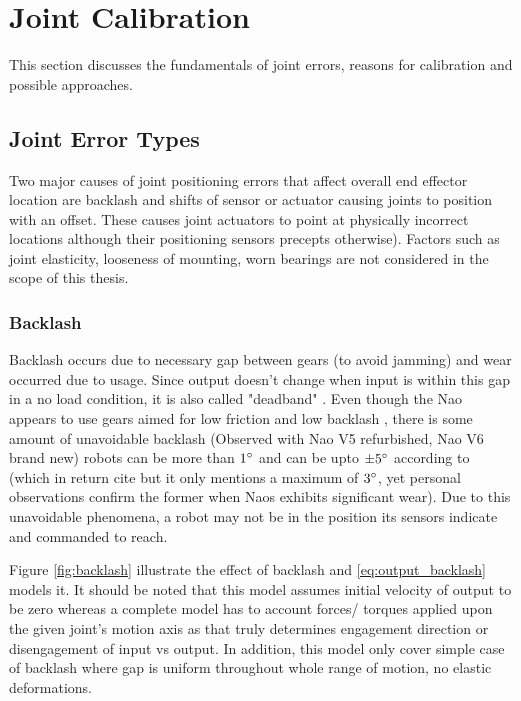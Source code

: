 \documentclass[english, printversion, nomenclature, notitle]{tuvisionthesis} %
\begin{document}
\section{Joint Calibration}
This section discusses the fundamentals of joint errors, reasons for calibration and possible approaches.

\subsection{Joint Error Types}

Two major causes of joint positioning errors that affect overall end effector location are backlash and shifts of sensor or actuator causing joints to position with an offset. These causes joint actuators to point at physically incorrect locations although their positioning sensors precepts otherwise). Factors such as joint elasticity, looseness of mounting, worn bearings are not considered in the scope of this thesis.

\subsubsection{Backlash}
\label{subsec:backlash}
Backlash occurs due to necessary gap between gears (to avoid jamming) and wear occurred due to usage. Since output doesn't change when input is within this gap in a no load condition, it is also called "deadband" \cite{ferney1995development}. Even though the Nao appears to use gears aimed for low friction and low backlash \cite{gouaillier_nao_2008}, there is some amount of unavoidable backlash (Observed with Nao V5 refurbished, Nao V6 brand new) robots can be more than $1\degree$ and can be upto $\pm 5\degree$ according to \cite{kastner_automatic_2015} (which in return cite \cite{gouaillier_nao_2008} but it only mentions a maximum of $3\degree$, yet personal observations confirm the former when Naos exhibits significant wear). Due to this unavoidable phenomena, a robot may not be in the position its sensors indicate and commanded to reach.

Figure \ref{fig:backlash} illustrate the effect of backlash and \cref{eq:output_backlash} models it. It should be noted that this model assumes initial velocity of output to be zero whereas a complete model has to account forces/ torques applied upon the given joint's motion axis as that truly determines engagement direction or disengagement of input vs output. In addition, this model only cover simple case of backlash where gap is uniform throughout whole range of motion, no elastic deformations.
\end{document}
